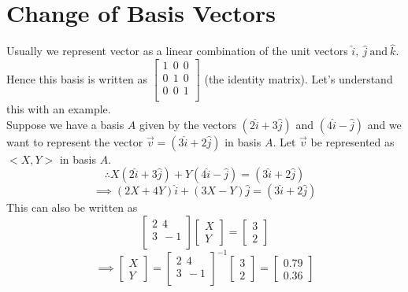 \documentclass[14pt]{article}
\begin{document}
\section{Change of Basis Vectors}
Usually we represent vector as a linear combination of the unit vectors $\hat{i}, \ \hat{j} \ \text{and} \ \hat{k}$. Hence this basis is written as
$\begin{bmatrix}
1 \ \ 0 \ \ 0 \\
0 \ \ 1 \ \ 0 \\
0 \ \ 0 \ \ 1 \\
\end{bmatrix}
$ (the identity matrix). Let's understand this with an example. \\
Suppose we have a basis $A$ given by the vectors $(2\hat{i}+3\hat{j})$ and $(4\hat{i}-\hat{j})$ and we want to represent the vector $\vec{v} = (3\hat{i}+2\hat{j})$ in basis $A$. Let $\vec{v}$ be represented as $<X,Y>$ in basis $A$.
\begin{equation*}
	\therefore X(2\hat{i}+3\hat{j})+Y(4\hat{i}-\hat{j}) = (3\hat{i}+2\hat{j})
\end{equation*}
\begin{equation*}
	\implies (2X+4Y)\hat{i}+(3X-Y)\hat{j} = (3\hat{i}+2\hat{j})
\end{equation*}
This can also be written as
\[
	 \begin{bmatrix}
	 2 \ \ 4 \\
	 3 \ \ -1 \\
	 \end{bmatrix}
	 \begin{bmatrix}
	  X \\ Y
	 \end{bmatrix} = \begin{bmatrix}
	  3 \\ 2
	 \end{bmatrix}
\]
\[
\implies \begin{bmatrix}
X \\ Y
\end{bmatrix} = \begin{bmatrix}
2 \ \ 4 \\
3 \ \ -1 \\
\end{bmatrix}^{-1}
\begin{bmatrix}
3 \\ 2
\end{bmatrix} = \begin{bmatrix}
0.79 \\ 0.36
\end{bmatrix}
\]
\end{document}
